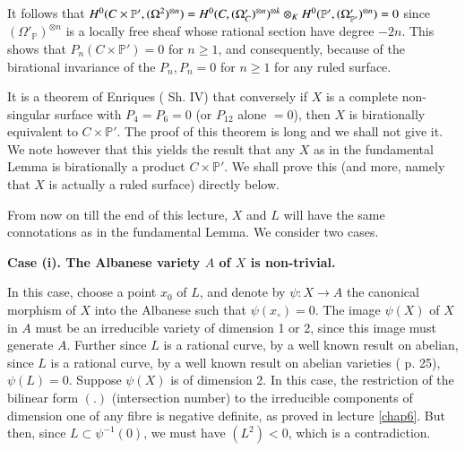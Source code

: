 It follows that $H^0(C \times \mathbb{P}',(\Omega^2)^{\otimes
  n})=H^0(C,(\Omega'_C)^{\otimes n})^{\otimes k} \otimes_K
H^0(\mathbb{P}',\break(\Omega'_{\mathbb{P}'})^{\otimes n})=0$ since
$(\Omega'_{\mathbb{P}})^{\otimes n}$ is a locally free sheaf whose
rational section have degree $-2n$. This shows that $P_n(C \times
\mathbb{P}')=0$ for $n \geq 1$, and consequently, because of the
birational invariance of the $P_n, P_n=0$ for $n \geq 1$ for any ruled
surface. 

It is a theorem of Enriques (\cite{key2} Sh. IV) that conversely if $X$ is a
complete non-singular surface with $P_4=P_6=0$ (or $P_{12}$ alone
$=0$), then $X$ is birationally equivalent to $C \times
\mathbb{P}'$. The proof of this theorem is long and we shall not give
it. We note however that this yields the result that any $X$ as in the
fundamental Lemma  is birationally a product $C \times
\mathbb{P}'$. We shall prove this (and more, namely that $X$ is
actually a ruled surface) directly below. 

From now on till the end of this lecture, $X$ and $L$ will have the
same connotations as in the fundamental Lemma. We consider two cases. 

\medskip
\noindent
{\bf Case (i). The Albanese variety $A$ of $X$ is non-trivial.}\pageoriginale

In this case, choose a point $x_0$ of $L$, and denote by $\psi:X \to
A$ the canonical morphism of $X$ into the Albanese such that
$\psi(x_\circ)=0$. The image $\psi(X)$ of $X$ in $A$ must be an
irreducible variety of dimension 1 or 2, since this image must
generate $A$. Further since $L$ is a rational curve, by a well known
result on abelian, since $L$ is a rational curve, by a well known
result on abelian varieties (\cite{key15} p. 25), $\psi(L)=0$. Suppose $\psi(X)$
is of dimension 2. In this case, the restriction of the bilinear
form $(.)$ (intersection number) to the irreducible components of
dimension one of any fibre is negative definite, as proved in lecture
\ref{chap6}. But then, since $L \subset \psi^{-1}(0)$, we must have $(L^2)<0$,
which is a contradiction. 

